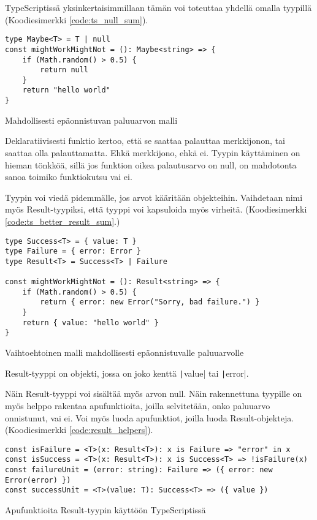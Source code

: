 TypeScriptissä yksinkertaisimmillaan tämän voi toteuttaa yhdellä omalla tyypillä (Koodiesimerkki \ref{code:ts_null_sum}).

\begin{code}
    \begin{verbatim}
type Maybe<T> = T | null
const mightWorkMightNot = (): Maybe<string> => {
    if (Math.random() > 0.5) {
        return null
    }
    return "hello world"
}
    \end{verbatim}
    \caption{Mahdollisesti epäonnistuvan paluuarvon malli}
    \label{code:ts_null_sum}
\end{code}

Deklaratiivisesti funktio kertoo, että se saattaa palauttaa merkkijonon, tai saattaa olla palauttamatta. Ehkä merkkijono, ehkä ei.
Tyypin käyttäminen on hieman tönkköä, sillä jos funktion oikea palautusarvo on null, on mahdotonta sanoa toimiko funktiokutsu vai ei.

Tyypin voi viedä pidemmälle, jos arvot kääritään objekteihin. Vaihdetaan nimi myös Result-tyypiksi, että tyyppi voi kapsuloida myös virheitä. (Koodiesimerkki \ref{code:ts_better_result_sum}.)

\begin{code}
    \begin{verbatim}
type Success<T> = { value: T }
type Failure = { error: Error }
type Result<T> = Success<T> | Failure 

const mightWorkMightNot = (): Result<string> => {
    if (Math.random() > 0.5) {
        return { error: new Error("Sorry, bad failure.") }
    }
    return { value: "hello world" }
}
    \end{verbatim}
    \caption{Vaihtoehtoinen malli mahdollisesti epäonnistuvalle paluuarvolle}
    \label{code:ts_better_result_sum}
\end{code}


Result-tyyppi on objekti, jossa on joko kenttä \texttt|value| tai \texttt|error|.

Näin Result-tyyppi voi sisältää myös arvon null. Näin rakennettuna tyypille on myös helppo rakentaa apufunktioita, joilla selvitetään, onko paluuarvo onnistunut, vai ei. Voi myös luoda apufunktiot, joilla luoda Result-objekteja. (Koodiesimerkki \ref{code:result_helpers}).

\begin{code}
    \begin{verbatim}
const isFailure = <T>(x: Result<T>): x is Failure => "error" in x
const isSuccess = <T>(x: Result<T>): x is Success<T> => !isFailure(x)
const failureUnit = (error: string): Failure => ({ error: new Error(error) })
const successUnit = <T>(value: T): Success<T> => ({ value })
    \end{verbatim}
    \caption{Apufunktioita Result-tyypin käyttöön TypeScriptissä}
    \label{code:result_helpers}
\end{code}

